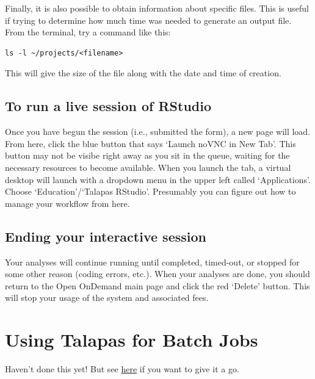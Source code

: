 \documentclass[]{book}
\begin{document}
Finally, it is also possible to obtain information about specific files. This is useful if trying to determine how much time was needed to generate an output file. From the terminal, try a command like this:

\begin{verbatim}
ls -l ~/projects/<filename>
\end{verbatim}

This will give the size of the file along with the date and time of creation.

\hypertarget{to-run-a-live-session-of-rstudio}{%
\subsection{To run a live session of RStudio}\label{to-run-a-live-session-of-rstudio}}

Once you have begun the session (i.e., submitted the form), a new page will load. From here, click the blue button that says `Launch noVNC in New Tab'. This button may not be visibe right away as you sit in the queue, waiting for the necessary resources to become available. When you launch the tab, a virtual desktop will launch with a dropdown menu in the upper left called `Applications'. Choose `Education'/`Talapas RStudio'. Presumably you can figure out how to manage your workflow from here.

\hypertarget{ending-your-interactive-session}{%
\subsection{Ending your interactive session}\label{ending-your-interactive-session}}

Your analyses will continue running until completed, timed-out, or stopped for some other reason (coding errors, etc.). When your analyses are done, you should return to the Open OnDemand main page and click the red `Delete' button. This will stop your usage of the system and associated fees.

\hypertarget{using-talapas-for-batch-jobs}{%
\section{Using Talapas for Batch Jobs}\label{using-talapas-for-batch-jobs}}

Haven't done this yet! But see \href{https://hpcrcf.atlassian.net/wiki/spaces/TCP/pages/7286491/How-to+Submit+a+Job}{here} if you want to give it a go.
\end{document}
